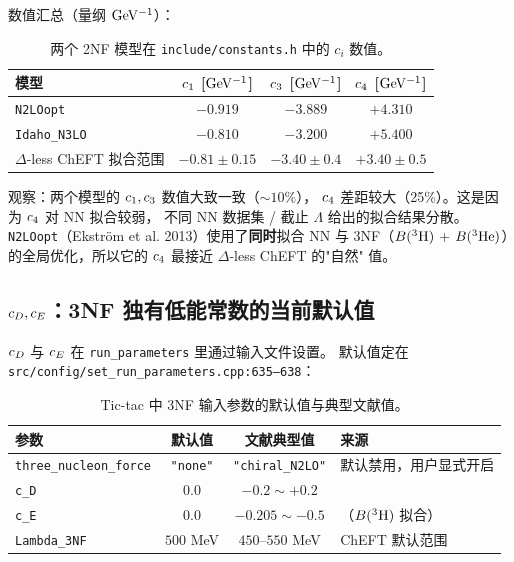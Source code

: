 数值汇总（量纲 \(\rm GeV^{-1}\)）：
\begin{table}[h]
\centering
\caption{两个 2NF 模型在 \texttt{include/constants.h} 中的 \(c_i\) 数值。}
\label{tab:ch15-ci-values}
\begin{tabular}{l c c c}
\toprule
模型 & \(c_1\) [\(\rm GeV^{-1}\)] & \(c_3\) [\(\rm GeV^{-1}\)] & \(c_4\) [\(\rm GeV^{-1}\)] \\
\midrule
\texttt{N2LOopt} \cite{N2LOopt}        & \(-0.919\) & \(-3.889\) & \(+4.310\) \\
\texttt{Idaho\_N3LO} \cite{IdahoN3LO}  & \(-0.810\) & \(-3.200\) & \(+5.400\) \\
\midrule
\(\Delta\)-less ChEFT 拟合范围 \cite{Epelbaum2002NLO3NF} & \(-0.81 \pm 0.15\) & \(-3.40 \pm 0.4\) & \(+3.40 \pm 0.5\) \\
\bottomrule
\end{tabular}
\end{table}

观察：两个模型的 \(c_1, c_3\) 数值大致一致（\(\sim 10\%\)），
\(c_4\) 差距较大（25\%）。这是因为 \(c_4\) 对 NN 拟合较弱，
不同 NN 数据集 / 截止 \(\Lambda\) 给出的拟合结果分散。
\texttt{N2LOopt}（Ekström et al. 2013）使用了\textbf{同时}拟合 NN 与
3NF（\(B(^3{\rm H})\) + \(B(^3{\rm He})\)）的全局优化，所以它的 \(c_4\)
最接近 \(\Delta\)-less ChEFT 的"自然" 值。

\subsection{\(c_D, c_E\)：3NF 独有低能常数的当前默认值}
\label{subsec:ch15-cD-cE}

\(c_D\) 与 \(c_E\) 在 \texttt{run\_parameters} 里通过输入文件设置。
默认值定在 \texttt{src/config/set\_run\_parameters.cpp:635--638}：

\begin{table}[h]
\centering
\caption{Tic-tac 中 3NF 输入参数的默认值与典型文献值。}
\label{tab:ch15-cD-cE-defaults}
\begin{tabular}{l c c l}
\toprule
参数 & 默认值 & 文献典型值 & 来源 \\
\midrule
\texttt{three\_nucleon\_force} & \texttt{"none"} & \texttt{"chiral\_N2LO"} & 默认禁用，用户显式开启 \\
\texttt{c\_D}                & \(0.0\) & \(-0.2 \sim +0.2\) & \cite{Epelbaum2002NLO3NF, Navratil2007} \\
\texttt{c\_E}                & \(0.0\) & \(-0.205 \sim -0.5\) & \cite{Epelbaum2002NLO3NF}（\(B(^3{\rm H})\) 拟合）\\
\texttt{Lambda\_3NF}         & \(500\) MeV & \(450\)–\(550\) MeV & ChEFT 默认范围 \\
\bottomrule
\end{tabular}
\end{table}

